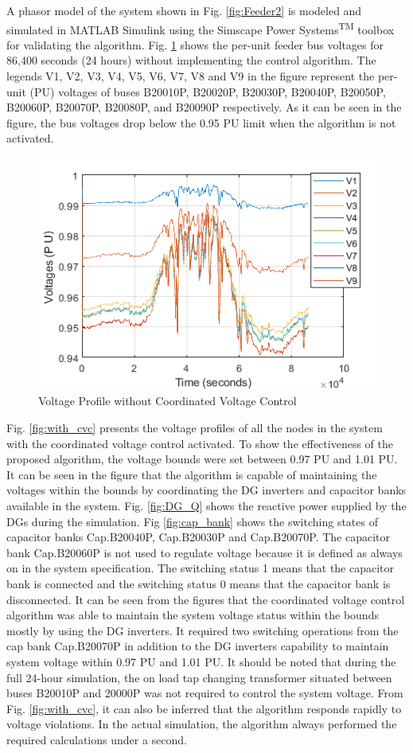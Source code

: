 A phasor model of the system shown in Fig. \ref{fig:Feeder2} is modeled and simulated  in MATLAB\textsuperscript{\textregistered} Simulink\textsuperscript{\textregistered} using the Simscape Power Systems\textsuperscript{TM} toolbox for validating the algorithm. Fig. \ref{fig:without_vvc} shows the per-unit feeder bus voltages for 86,400 seconds (24 hours) without implementing the control algorithm. The legends V1, V2, V3, V4, V5, V6, V7, V8 and V9 in the figure represent the per-unit (PU) voltages of buses B20010P, B20020P, B20030P, B20040P, B20050P, B20060P, B20070P, B20080P, and B20090P respectively. As it can be seen in the figure, the bus voltages drop below the 0.95 PU limit when the algorithm is not activated.

\begin{figure}[!h]
\centering
\includegraphics[width=0.6\linewidth]{figs/CVC/Without_VVC.png}
\caption{Voltage Profile without Coordinated Voltage Control}
\label{fig:without_vvc}
\end{figure}

Fig. \ref{fig:with_cvc} presents the voltage profiles of all the nodes in the system with the coordinated voltage control activated. To show the effectiveness of the proposed algorithm, the voltage bounds were set between 0.97 PU and 1.01 PU. It can be seen in the figure that the algorithm is capable of maintaining the voltages within the bounds by coordinating the DG inverters and capacitor banks available in the system. Fig. \ref{fig:DG_Q} shows the reactive power supplied by the DGs during the simulation. Fig \ref{fig:cap_bank} shows the switching states of capacitor banks Cap.B20040P, Cap.B20030P and Cap.B20070P. The capacitor bank Cap.B20060P is not used to regulate voltage because it is defined as always on in the system specification. The switching status 1 means that the capacitor bank is connected and the switching status 0 means that the capacitor bank is disconnected. It can be seen from the figures that the coordinated voltage control algorithm was able to maintain the system voltage status within the bounds mostly by using the DG inverters. It required two switching operations from the cap bank Cap.B20070P in addition to the DG inverters capability to maintain system voltage within 0.97 PU and 1.01 PU. It should be noted that during the full 24-hour simulation, the on load tap changing transformer situated between buses B20010P and 20000P was not required to control the system voltage. From Fig. \ref{fig:with_cvc}, it can also be inferred that the algorithm responds rapidly to voltage violations. In the actual simulation, the algorithm always performed the required calculations under a second.

